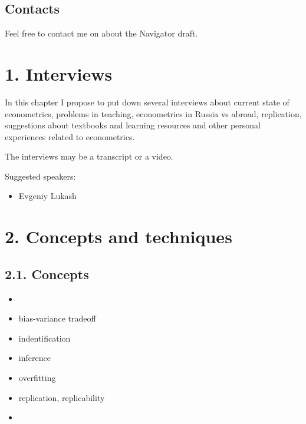 \documentclass[letterpaper,10pt,english]{sphinxmanual}
\begin{document}
\section{Contacts}
\label{\detokenize{forward:contacts}}
Feel free to contact me on 
about the Navigator draft.


\chapter{1. Interviews}
\label{\detokenize{interviews::doc}}\label{\detokenize{interviews:interviews}}
In this chapter I propose to put down several interviews about
current state of econometrics, problems in teaching, econometrics in
Russia vs abroad, replication, suggestions about textbooks and
learning resources and other personal experiences related to econometrics.

The interviews may be a transcript or a video.

Suggested speakers:
\begin{itemize}
\item {} 
Evgeniy Lukash

\end{itemize}


\chapter{2. Concepts and techniques}
\label{\detokenize{topics::doc}}\label{\detokenize{topics:concepts-and-techniques}}

\section{2.1. Concepts}
\label{\detokenize{topics:concepts}}\begin{itemize}
\item {} 

\item {} 
bias-variance tradeoff

\item {} 
indentification

\item {} 
inference

\item {} 
overfitting

\item {} 
replication, replicability

\item {} 

\end{itemize}
\end{document}
